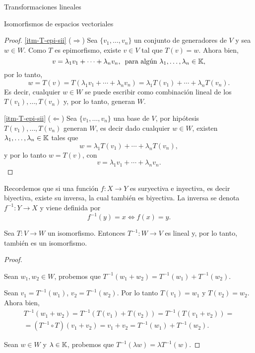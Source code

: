 \begin{chapter}{Transformaciones lineales}
\begin{section}{Isomorfismos de espacios vectoriales}
\begin{proof}
        \ref{itm-T-epi-sii} ($\Rightarrow$) Sea   $\{v_1,\ldots,v_n \}$ un conjunto de generadores de $V$ y sea  $w \in W$. Como $T$  es epimorfismo, existe $v \in V$ tal que $T(v)=w$. Ahora bien, 
        $$
        v = \lambda_1v_1+\cdots + \lambda_{n}v_n,\, \text{ para algún $\lambda_1,\ldots,\lambda_n \in \mathbb K$,}
        $$
        por lo tanto,
        $$
        w =T(v) = T(\lambda_1v_1+\cdots + \lambda_{n}v_n) = \lambda_1T(v_1) +\cdots+ \lambda_{n}T(v_n).
        $$ 
        Es decir,  cualquier $w \in W$ se puede escribir como combinación lineal de los  $T(v_1),\ldots,T(v_n)$ y, por lo tanto,  generan $W$.
        
            \ref{itm-T-epi-sii} ($\Leftarrow$) Sea $\{v_1,\ldots,v_n \}$ una base de $V$, por hipótesis $T(v_1),\ldots,T(v_n)$ generan $W$,  es decir dado cualquier $w \in W$,   existen $\lambda_1,\ldots,\lambda_n \in \mathbb K$ tales que
        $$
        w = \lambda_1T(v_1)+\cdots + \lambda_{n}T(v_n),
        $$
        y por lo tanto $w = T(v)$,  con 
        $$
        v = \lambda_1v_1+\cdots + \lambda_{n}v_n.
        $$
        \end{proof}

        Recordemos que si una función $f: X \to Y$ es suryectiva e inyectiva, es decir biyectiva, existe su inversa, la cual también es biyectiva. La inversa se denota $f^{-1}: Y \to X$ y viene definida por
        $$
        f^{-1}(y) = x \Leftrightarrow f(x) =y.
        $$ 
        
        \begin{teorema}
            Sea $T:V \to W$ un isomorfismo. Entonces $T^{-1}: W \to V$ es lineal y, por lo tanto, también es un isomorfismo.
        \end{teorema}
        \begin{proof}
            \
            
            Sean $w_1, w_2 \in W$, probemos que $ T^{-1}(w_1+w_2) =  T^{-1}(w_1)+ T^{-1}(w_2)$. 
            
            Sean $v_1 = T^{-1}(w_1) $, $v_2 = T^{-1}(w_2)$. Por lo tanto $T(v_1) = w_1$ y $T(v_2) = w_2$. Ahora bien,
            \begin{multline*}
                T^{-1}(w_1+w_2) = 	T^{-1}(T(v_1)+T(v_2))  = 	T^{-1}(T(v_1+v_2)) = \\ =(T^{-1}\circ T)(v_1+v_2) = v_1+v_2 = T^{-1}(w_1)+ T^{-1}(w_2). 
            \end{multline*}    
            
            
            Sean $w \in W$ y $\lambda  \in \mathbb K$, probemos que $T^{-1}(\lambda w) =\lambda  T^{-1}(w)$. 
            

\end{proof}
\end{section}
\end{chapter}
